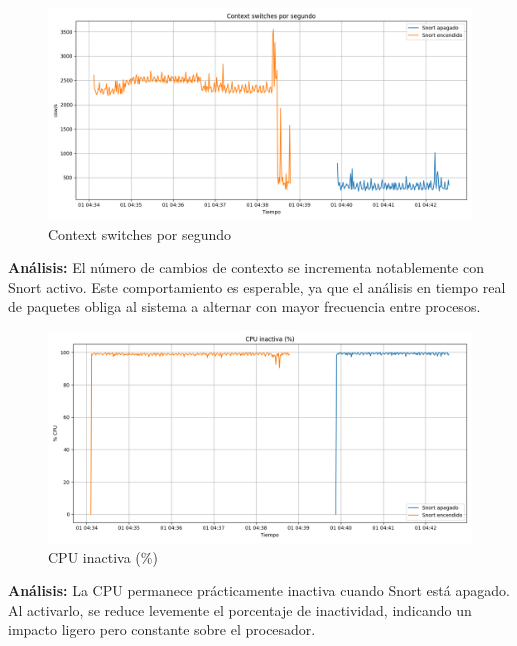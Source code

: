\documentclass[11pt,a4paper,twoside]{report}
\begin{document}
\begin{figure}[H]
	\centering
	\includegraphics[width=\textwidth]{graficas/context_switch.png}
	\caption{Context switches por segundo}
\end{figure}
\textbf{Análisis:} El número de cambios de contexto se incrementa notablemente con Snort activo. Este comportamiento es esperable, ya que el análisis en tiempo real de paquetes obliga al sistema a alternar con mayor frecuencia entre procesos.

\begin{figure}[H]
	\centering
	\includegraphics[width=\textwidth]{graficas/cpu_idle.png}
	\caption{CPU inactiva (\%)}
\end{figure}
\textbf{Análisis:} La CPU permanece prácticamente inactiva cuando Snort está apagado. Al activarlo, se reduce levemente el porcentaje de inactividad, indicando un impacto ligero pero constante sobre el procesador.
\end{document}
